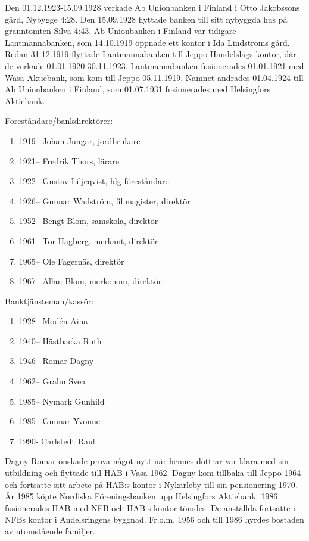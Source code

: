 Den 01.12.1923-15.09.1928 verkade Ab Unionbanken i Finland i Otto Jakobssons gård, Nybygge 4:28. Den 15.09.1928 flyttade banken till sitt nybyggda hus på granntomten Silva 4:43. Ab Unionbanken i Finland var tidigare Lantmannabanken, som 14.10.1919 öppnade ett kontor i Ida Lindströms gård. Redan 31.12.1919 flyttade Lantmannabanken till Jeppo Handelslags kontor, där de verkade 01.01.1920-30.11.1923. Lantmannabanken fusionerades 01.01.1921 med Wasa Aktiebank, som kom till Jeppo 05.11.1919. Namnet ändrades 01.04.1924 till Ab Unionbanken i Finland, som 01.07.1931 fusionerades med Helsingfors Aktiebank.

Föreståndare/bankdirektörer:
\begin{enumerate}
  \item 1919--	Johan Jungar,	jordbrukare
  \item 1921--	Fredrik Thors, lärare
  \item 1922--	Gustav Liljeqvist, hlg-föreståndare
  \item 1926--	Gunnar Wadström, fil.magister, direktör
  \item 1952--	Bengt Blom, samskola, direktör
  \item 1961--	Tor Hagberg, merkant, direktör
  \item 1965--	Ole Fagernäs, direktör
  \item 1967--	Allan Blom,	merkonom, direktör
\end{enumerate}

Banktjänsteman/kassör:
\begin{enumerate}
  \item 1928-- Modén Aina
  \item 1940--	Hästbacka Ruth
  \item 1946--	Romar Dagny
  \item 1962-- Grahn Svea
  \item 1985-- Nymark Gunhild
  \item 1985--	Gunnar Yvonne
  \item 1990- 	  Carlstedt Raul
\end{enumerate}

Dagny Romar önskade prova något nytt när hennes döttrar var klara med sin utbildning och flyttade till HAB i Vasa 1962. Dagny kom tillbaka till Jeppo 1964 och fortsatte sitt arbete på HAB:s kontor i Nykarleby till sin pensionering 1970. År 1985 köpte Nordiska Föreningsbanken upp Helsingfors Aktiebank. 1986 fusionerades HAB med NFB och HAB:s kontor tömdes. De anställda fortsatte i NFBs kontor i Andelsringens byggnad. Fr.o.m. 1956 och till 1986 hyrdes bostaden av utomstående familjer.

